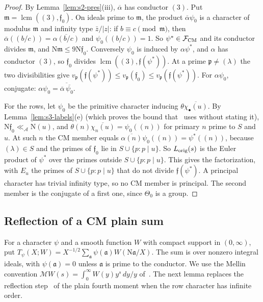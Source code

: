 \documentclass[11pt]{article}
\numberwithin{equation}{section}
\newcommand{\N}{\mathrm N}
\begin{document}
\begin{proof}
By Lemma~\ref{lem:s2-pres}(iii), $\overline\alpha$ has conductor $(3)$. Put $\mathfrak m=\operatorname{lcm}((3),\mathfrak f_0)$.
On ideals prime to $\mathfrak m$, the product $\overline\alpha\psi_0$ is a character of modulus $\mathfrak m$ and
infinity type $\bar z/|z|$: if $b\equiv c\pmod{\mathfrak m}$, then $\overline\alpha((b/c))=\overline{\alpha(b/c)}$
and $\psi_0((b/c))=1$. So $\psi^*\in\mathcal F_{\rm CM}$ and its conductor divides $\mathfrak m$, and
$\N\mathfrak m\le9\N\mathfrak f_0$. Conversely $\psi_0$ is induced by $\alpha\psi^*$, and $\alpha$ has conductor
$(3)$, so $\mathfrak f_0$ divides $\operatorname{lcm}((3),\mathfrak f(\psi^*))$. At a prime $\mathfrak p\ne(\lambda)$
the two divisibilities give
$v_{\mathfrak p}(\mathfrak f(\psi^*))\le v_{\mathfrak p}(\mathfrak f_0)\le v_{\mathfrak p}(\mathfrak f(\psi^*))$.
For $\alpha\psi_0$, conjugate: $\alpha\psi_0=\overline{\overline\alpha\,\overline{\psi_0}}$.

For the rows, let $\psi_0$ be the primitive character inducing $\theta\overline{\chi_\bullet(u)}$.
By Lemma~\ref{lem:s3-labels}(e) (which proves the bound that~\cite[Section~8.1]{OAI78} uses without stating it),
$\N\mathfrak f_0\ll_{\mathcal A}\N(u)$, and $\theta(n)\overline{\chi_n(u)}=\psi_0((n))$ for
primary $n$ prime to $S$ and $u$. At such $n$ the CM member equals $\overline{\alpha(n)}\psi_0((n))=\psi^*((n))$,
because $(\lambda)\in S$ and the primes of $\mathfrak f_0$ lie in $S\cup\{p:p\mid u\}$. So $L_{\rm orig}(s)$ is the
Euler product of $\psi^*$ over the primes outside $S\cup\{p:p\mid u\}$. This gives the factorization, with
$E_u$ the primes of $S\cup\{p:p\mid u\}$ that do not divide $\mathfrak f(\psi^*)$. A principal character has
trivial infinity type, so no CM member is principal. The second member is the conjugate of a first one, since
$\Theta_0$ is a group.
\end{proof}

\subsection{Reflection of a CM plain sum}\label{sec:s2-refl}
For a character $\psi$ and a smooth function $W$ with compact support in $(0,\infty)$, put
$T_\psi(X;W)=X^{-1/2}\sum_{\mathfrak a}\psi(\mathfrak a)W(\N\mathfrak a/X)$. The sum is over nonzero integral ideals,
with $\psi(\mathfrak a)=0$ unless $\mathfrak a$ is prime to the conductor. We use the Mellin convention
$\mathcal MW(s)=\int_0^\infty W(y)y^s\,dy/y$ of~\cite[Lemma~4.5]{OAI78}. The next lemma replaces
the reflection step~\cite[Section~18.1]{OAI78} of the plain fourth moment when the row character has infinite
order.
\end{document}
